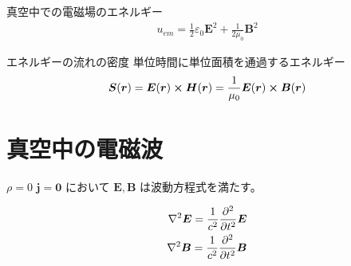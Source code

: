\documentclass[uplatex,dvipdfmx,a4paper,11pt]{jlreq}
\newcommand{\EE}{\bm{E}}
\newcommand{\BB}{\bm{B}}
\newcommand{\rr}{\bm{r}}
\renewcommand{\SS}{\bm{S}}
\theoremstyle{definition}
\begin{document}
\begin{proposition}[極座標で表した電気双極子]
\end{proposition}

\begin{theorem}
  真空中での電磁場のエネルギー
  \begin{align}
    u_{em} = \frac{1}{2}\varepsilon_0\EE^2 + \frac{1}{2\mu_0}\BB^2
  \end{align}
\end{theorem}

\begin{definition}
  エネルギーの流れの密度
  単位時間に単位面積を通過するエネルギー
  \begin{align}
    \SS(\rr) = \EE(\rr)\cross\bm{H}(\rr) = \frac{1}{\mu_0}\EE(\rr)\cross\BB(\rr)
  \end{align}
\end{definition}


\section{真空中の電磁波}

\begin{proposition}
  $\rho = 0$ $\bm{j} = \bm{0}$ において $\EE, \BB$ は波動方程式を満たす。
\end{proposition}
\begin{align}
  \nabla^2\EE = \frac{1}{c^2}\pdv[2]{t}\EE \\
  \nabla^2\BB = \frac{1}{c^2}\pdv[2]{t}\BB
\end{align}
\end{document}
